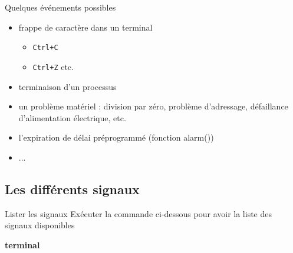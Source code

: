 \documentclass[9pt]{beamer}
\newenvironment{code}[1]{%
    \begin{bclogo}[couleur=backcolour, couleurTexte=black ,couleurBord=bleulapis ,couleurBarre=black, ombre=false,epBord=0.9,logo=\#,arrondi=0.1]{{\bfseries #1}}%
    }%
    {%
    \end{bclogo}
}%
\begin{document}
\begin{frame}
Quelques événements possibles
\begin{itemize}[<+->]
    \item frappe de caractère dans un terminal
    \begin{itemize}
        \item  \texttt{Ctrl+C} 
        \item \texttt{Ctrl+Z} etc.
    \end{itemize}
    \item terminaison d'un processus
    \item un problème matériel : division par zéro, problème d'adressage, défaillance d'alimentation électrique, etc.
    \item l'expiration de délai préprogrammé (fonction alarm())
    \item ...
\end{itemize}
\end{frame}

\subsection{Les différents signaux}
 
\begin{frame}{Lister les signaux}
Exécuter la commande ci-dessous pour avoir la liste des signaux disponibles
\begin{code}{terminal}
   \parbox{6cm}{  \ex}
\end{code}
\end{frame}
\end{document}
